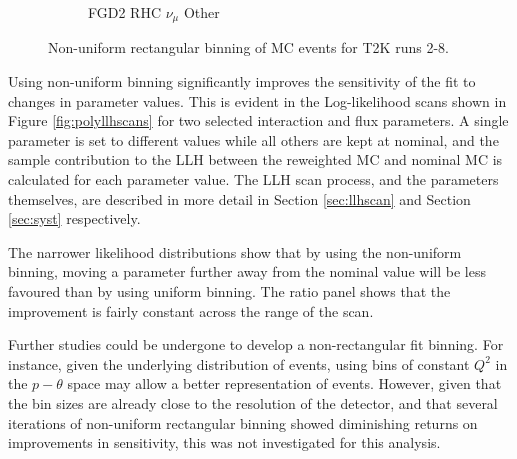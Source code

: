\begin{figure}
\begin{subfigure}{.32\textwidth}
  \caption{FGD2 RHC $\nu_{\mu}$ Other}
  \label{fig:th2polyFGD2_NuMuBkg_CCOther_in_AntiNu_Mode}
\end{subfigure}
\caption{Non-uniform rectangular binning of MC events for T2K runs 2-8.}
\label{fig:th2polybin}
\end{figure}

Using non-uniform binning significantly improves the sensitivity of the fit to changes in parameter values. This is evident in the Log-likelihood scans shown in Figure \ref{fig:polyllhscans} for two selected interaction and flux parameters. A single parameter is set to different values while all others are kept at nominal, and the sample contribution to the LLH between the reweighted MC and nominal MC is calculated for each parameter value. The LLH scan process, and the parameters themselves, are described in more detail in Section \ref{sec:llhscan} and Section \ref{sec:syst} respectively.

The narrower likelihood distributions show that by using the non-uniform binning, moving a parameter further away from the nominal value will be less favoured than by using uniform binning. The ratio panel shows that the improvement is fairly constant across the range of the scan.

Further studies could be undergone to develop a non-rectangular fit binning. For instance, given the underlying distribution of events, using bins of constant $Q^2$ in the $p-\theta$ space may allow a better representation of events. However, given that the bin sizes are already close to the resolution of the detector, and that several iterations of non-uniform rectangular binning showed diminishing returns on improvements in sensitivity, this was not investigated for this analysis.

